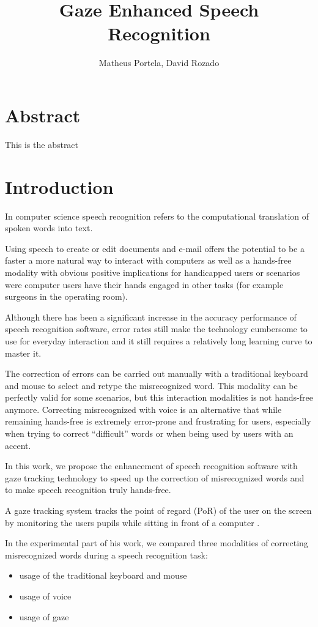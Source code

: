 \documentclass[]{article}
\title{Gaze Enhanced Speech Recognition}
\author{Matheus Portela, David Rozado}
\begin{document}
\maketitle

\section{Abstract}
This is the abstract

\section{Introduction}
In computer science speech recognition refers to the computational translation of spoken words into text.

Using speech to create or edit documents and e-mail offers the potential to be a faster a more natural way to interact
with computers as well as a hands-free modality with obvious positive implications for handicapped users or
scenarios were computer users have their hands engaged in other tasks (for example surgeons in the operating room).

Although there has been a significant increase in the accuracy performance of speech recognition software, error
rates still make the technology cumbersome to use for everyday interaction  and it still requires a relatively long
learning curve to master it.

The correction of errors can be carried out manually with a traditional keyboard and mouse to select and retype the
misrecognized word. This modality can be perfectly valid for some scenarios, but this interaction modalities is not
hands-free anymore.  Correcting misrecognized with voice is an alternative that while remaining hands-free is extremely
error-prone and frustrating for users, especially when trying to correct ``difficult'' words or when being used by users
with an accent.

In this work, we propose the enhancement of speech recognition software with gaze tracking technology to speed up the
correction of misrecognized words and to make speech recognition truly hands-free.

A gaze tracking system tracks the point of regard (PoR) of the user on the screen by monitoring the users pupils while
sitting in front of a computer \cite{Rozado2012a}.

In the experimental part of his work, we compared three modalities of correcting misrecognized words during  a speech
recognition task:
\begin{itemize}
  \item usage of the traditional keyboard and mouse
  \item usage of voice
  \item usage of gaze
\end{itemize}
\end{document}
